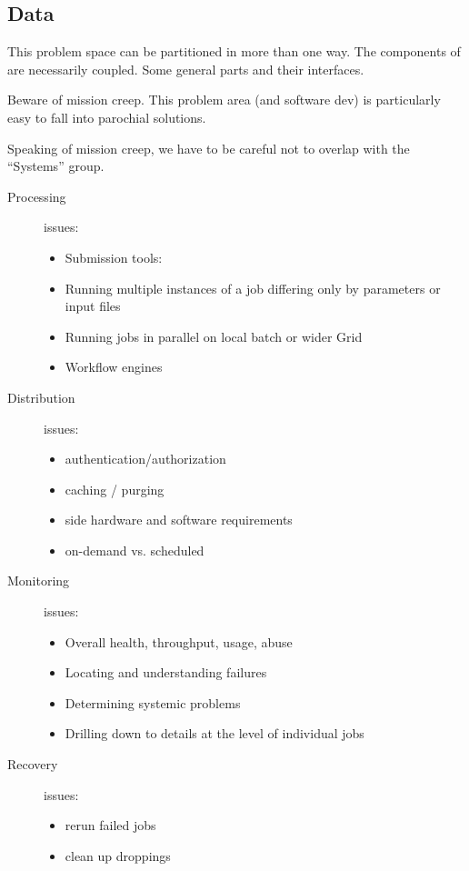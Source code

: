\subsection{Data}

This problem space can be partitioned in more than one way.  The
components of are necessarily coupled.  Some general parts and their
interfaces.

Beware of mission creep.  This problem area (and software dev) is particularly easy to fall into parochial solutions.

Speaking of mission creep, we have to be careful not to overlap with the ``Systems'' group.

\begin{description}
\item[Processing] issues:

  \begin{itemize}
  \item Submission tools:
  \item Running multiple instances of a job differing only by parameters or input files
  \item Running jobs in parallel on local batch or wider Grid
  \item Workflow engines
  \end{itemize}
\item[Distribution] issues:
  \begin{itemize}
  \item authentication/authorization
  \item caching / purging
  \item side hardware and software requirements
  \item on-demand vs. scheduled
  \end{itemize}
\item[Monitoring] issues:
  \begin{itemize}
  \item Overall health, throughput, usage, abuse
  \item Locating and understanding failures
  \item Determining systemic problems
  \item Drilling down to details at the level of individual jobs
  \end{itemize}
\item[Recovery] issues:
  \begin{itemize}
  \item rerun failed jobs
  \item clean up droppings

\end{itemize}
\end{description}
